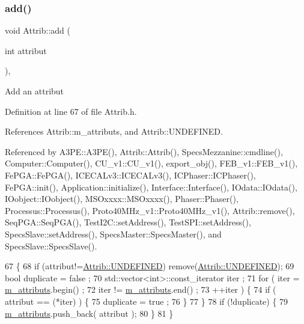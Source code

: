 \subsubsection{\texorpdfstring{add()}{add()}}
{\footnotesize\ttfamily void Attrib\+::add (\begin{DoxyParamCaption}\item[{int}]{attribut }\end{DoxyParamCaption})\hspace{0.3cm}{\ttfamily [inline]}, {\ttfamily [inherited]}}

Add an attribut 

Definition at line 67 of file Attrib.\+h.



References Attrib\+::m\+\_\+attributs, and Attrib\+::\+U\+N\+D\+E\+F\+I\+N\+ED.



Referenced by A3\+P\+E\+::\+A3\+P\+E(), Attrib\+::\+Attrib(), Specs\+Mezzanine\+::cmdline(), Computer\+::\+Computer(), C\+U\+\_\+v1\+::\+C\+U\+\_\+v1(), export\+\_\+obj(), F\+E\+B\+\_\+v1\+::\+F\+E\+B\+\_\+v1(), Fe\+P\+G\+A\+::\+Fe\+P\+G\+A(), I\+C\+E\+C\+A\+Lv3\+::\+I\+C\+E\+C\+A\+Lv3(), I\+C\+Phaser\+::\+I\+C\+Phaser(), Fe\+P\+G\+A\+::init(), Application\+::initialize(), Interface\+::\+Interface(), I\+Odata\+::\+I\+Odata(), I\+Oobject\+::\+I\+Oobject(), M\+S\+Oxxxx\+::\+M\+S\+Oxxxx(), Phaser\+::\+Phaser(), Processus\+::\+Processus(), Proto40\+M\+Hz\+\_\+v1\+::\+Proto40\+M\+Hz\+\_\+v1(), Attrib\+::remove(), Seq\+P\+G\+A\+::\+Seq\+P\+G\+A(), Test\+I2\+C\+::set\+Address(), Test\+S\+P\+I\+::set\+Address(), Specs\+Slave\+::set\+Address(), Specs\+Master\+::\+Specs\+Master(), and Specs\+Slave\+::\+Specs\+Slave().


\begin{DoxyCode}
67                             \{
68     \textcolor{keywordflow}{if} (attribut!=\hyperlink{classAttrib_a69e171d7cc6417835a5a306d3c764235a3a8da2ab97dda18aebab196fe4100531}{Attrib::UNDEFINED}) \textcolor{keyword}{remove}(\hyperlink{classAttrib_a69e171d7cc6417835a5a306d3c764235a3a8da2ab97dda18aebab196fe4100531}{Attrib::UNDEFINED});
69     \textcolor{keywordtype}{bool} duplicate = false ;
70     std::vector<int>::const\_iterator iter ;
71     \textcolor{keywordflow}{for} ( iter  = \hyperlink{classAttrib_ac4bd58a0cc6b38a3b711d609a3d3aacc}{m\_attributs}.begin() ;
72           iter != \hyperlink{classAttrib_ac4bd58a0cc6b38a3b711d609a3d3aacc}{m\_attributs}.end()   ;
73           ++iter ) \{
74       \textcolor{keywordflow}{if} ( attribut == (*iter) ) \{
75         duplicate = true ;
76       \}
77     \}
78     \textcolor{keywordflow}{if} (!duplicate) \{
79       \hyperlink{classAttrib_ac4bd58a0cc6b38a3b711d609a3d3aacc}{m\_attributs}.push\_back( attribut );
80     \}
81   \}
\end{DoxyCode}
\mbox{\label{classProcessus_a308c8f193802f1d1ab49d4447d0cb281}} 
